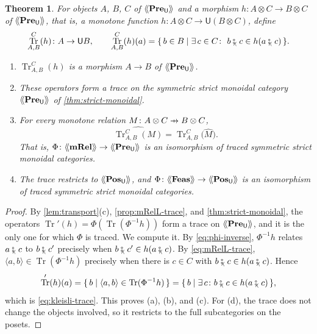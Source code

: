 \documentclass[11pt,a4paper]{article}
\theoremstyle{plain}
\newtheorem{theorem}{Theorem}[section]
\theoremstyle{definition}
\theoremstyle{remark}
\newcommand{\Cat}[1]{\mathbf{#1}}
\newcommand{\Pre}{\Cat{Pre}}
\newcommand{\Pos}{\Cat{Pos}}
\newcommand{\mRel}{\Cat{mRel}}
\newcommand{\Feas}{\Cat{Feas}}
\newcommand{\U}{\mathsf{U}}
\newcommand{\PreU}{\Pre_{\U}}
\newcommand{\PosU}{\Pos_{\U}}
\providecommand{\llangle}{\mathopen{\langle\mkern-3.5mu\langle}}
\providecommand{\rrangle}{\mathclose{\rangle\mkern-3.5mu\rangle}}
\newcommand{\tL}[1]{\llangle #1 \rrangle}
\newcommand{\tc}{\mathbin{\fatsemi_{\!\scriptscriptstyle\langle}}}
\newcommand{\tup}[1]{\langle #1 \rangle}
\newcommand{\profto}{\mathrel{\ooalign{\hfil$\mapstochar\mkern 5mu$\hfil\cr$\to$\cr}}}
\DeclareMathOperator{\Tr}{Tr}
\begin{document}
\begin{theorem}
    \label{thm:trace}
    For objects $A$, $B$, $C$ of $\tL{\PreU}$ and a morphism $h \colon A \otimes C \to B \otimes C$ of $\tL{\PreU}$, that is, a monotone function $h \colon A \otimes C \to \U(B \otimes C)$, define
    \begin{equation}
        \label{eq:kleisli-trace}
        \Tr^{C}_{A,B}(h) \colon A \to \U B,
        \qquad
        \Tr^{C}_{A,B}(h)(a) = \{\, b \in B \mid \exists\, c \in C \colon\ b \tc c \in h(a \tc c) \,\}.
    \end{equation}
    \begin{enumerate}[label=(\alph*)]
        \item $\Tr^{C}_{A,B}(h)$ is a morphism $A \to B$ of $\tL{\PreU}$.
        \item These operators form a trace on the symmetric strict monoidal category $\tL{\PreU}$ of \cref{thm:strict-monoidal}.
        \item For every monotone relation $M \colon A \otimes C \profto B \otimes C$,
              \begin{equation}
                  \label{eq:hat-trace}
                  \widehat{\Tr^{C}_{A,B}(M)} = \Tr^{C}_{A,B}\bigl(\widehat{M}\bigr).
              \end{equation}
              That is, $\Phi \colon \tL{\mRel} \to \tL{\PreU}$ is an isomorphism of traced symmetric strict monoidal categories.
        \item The trace restricts to $\tL{\PosU}$, and $\Phi \colon \tL{\Feas} \to \tL{\PosU}$ is an isomorphism of traced symmetric strict monoidal categories.
    \end{enumerate}
\end{theorem}
\begin{proof}
    By \cref{lem:transport}(c), \cref{prop:mRelL-trace}, and \cref{thm:strict-monoidal}, the operators $\Tr'(h) = \Phi(\Tr(\Phi^{-1}h))$ form a trace on $\tL{\PreU}$, and it is the only one for which $\Phi$ is traced.
    We compute it.
    By \cref{eq:phi-inverse}, $\Phi^{-1}h$ relates $a \tc c$ to $b \tc c'$ precisely when $b \tc c' \in h(a \tc c)$.
    By \cref{eq:mRelL-trace}, $\tup{a,b} \in \Tr(\Phi^{-1}h)$ precisely when there is $c \in C$ with $b \tc c \in h(a \tc c)$.
    Hence
    \begin{equation*}
        \Tr'(h)(a) = \{\, b \mid \tup{a,b} \in \Tr(\Phi^{-1}h) \,\} = \{\, b \mid \exists\, c \colon b \tc c \in h(a \tc c) \,\},
    \end{equation*}
    which is \cref{eq:kleisli-trace}.
    This proves (a), (b), and (c).
    For (d), the trace does not change the objects involved, so it restricts to the full subcategories on the posets.
\end{proof}
\end{document}
